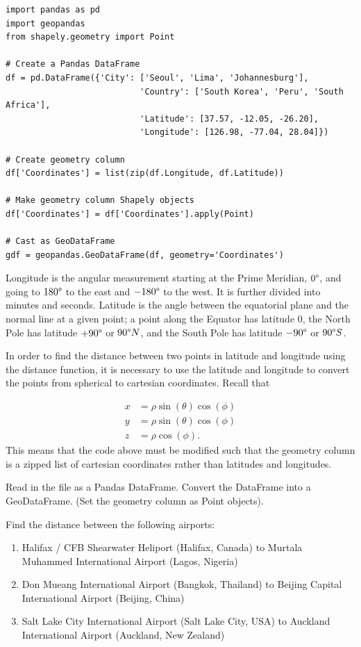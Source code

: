 \begin{lstlisting}
import pandas as pd
import geopandas
from shapely.geometry import Point

# Create a Pandas DataFrame
df = pd.DataFrame({'City': ['Seoul', 'Lima', 'Johannesburg'],
                           'Country': ['South Korea', 'Peru', 'South Africa'],
                           'Latitude': [37.57, -12.05, -26.20],
                           'Longitude': [126.98, -77.04, 28.04]})
                                 
# Create geometry column
df['Coordinates'] = list(zip(df.Longitude, df.Latitude))

# Make geometry column Shapely objects
df['Coordinates'] = df['Coordinates'].apply(Point)

# Cast as GeoDataFrame
gdf = geopandas.GeoDataFrame(df, geometry='Coordinates')
\end{lstlisting}

\begin{info}
Longitude is the angular measurement starting at the Prime Meridian, $0\degree$, and going to $180\degree$ to the east and $-180\degree$ to the west.
It is further divided into minutes and seconds.
Latitude is the angle between the equatorial plane and the normal line at a given point; a point along the Equator has latitude $0$, the North Pole has latitude $+90\degree$ or $90\degree N$, and the South Pole has latitude $-90\degree$ or $90\degree S$.
\end{info}

In order to find the distance between two points in latitude and longitude using the distance function, it is necessary to use the latitude and longitude to convert the points from spherical to cartesian coordinates.
Recall that

\begin{align*}
x&=\rho\sin(\theta)\cos(\phi)\\
y&=\rho\sin(\theta)\cos(\phi)\\
z&=\rho\cos(\phi).
\end{align*}
This means that the code above must be modified such that the geometry column is a zipped list of cartesian coordinates rather than latitudes and longitudes.

\begin{problem}
Read in the file  as a Pandas DataFrame.
Convert the DataFrame into a GeoDataFrame.
(Set the geometry column as Point objects).

Find the distance between the following airports:
\begin{enumerate}
\item Halifax / CFB Shearwater Heliport (Halifax, Canada) to Murtala Muhammed International Airport (Lagos, Nigeria)
\item Don Mueang International Airport (Bangkok, Thailand) to Beijing Capital International Airport (Beijing, China)
\item Salt Lake City International Airport (Salt Lake City, USA) to Auckland International Airport (Auckland, New Zealand)
\end{enumerate}
\end{problem}

